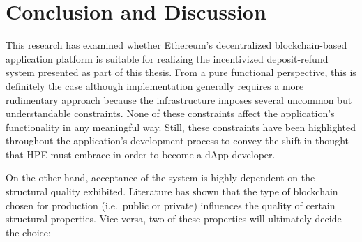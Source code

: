 
\chapter{Conclusion and Discussion}
\label{chp:conclusion}
This research has examined whether Ethereum's decentralized blockchain-based application platform is suitable for realizing the incentivized deposit-refund system presented as part of this thesis. From a pure functional perspective, this is definitely the case although implementation generally requires a more rudimentary approach because the infrastructure imposes several uncommon but understandable constraints. None of these constraints affect the application's functionality in any meaningful way. Still, these constraints have been highlighted throughout the application's development process to convey the shift in thought that \ac{HPE} must embrace in order to become a \ac{dApp} developer.

On the other hand, acceptance of the system is highly dependent on the structural quality exhibited. Literature has shown that the type of blockchain chosen for production (i.e.~public or private) influences the quality of certain structural properties. Vice-versa, two of these properties will ultimately decide the choice: 

